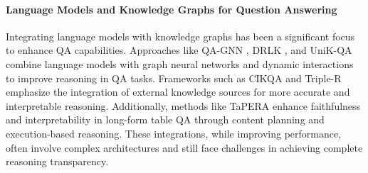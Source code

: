 \paragraph{Language Models and Knowledge Graphs for Question Answering}

Integrating language models with knowledge graphs has been a significant focus to enhance QA capabilities. Approaches like QA-GNN \citep{yasunaga-etal-2021-qa}, DRLK \citep{zhang-etal-2022-drlk}, and UniK-QA \citep{oguz-etal-2022-unik} combine language models with graph neural networks and dynamic interactions to improve reasoning in QA tasks. Frameworks such as CIKQA \citep{zhang-etal-2023-cikqa} and Triple-R \citep{kanaani-etal-2024-triple} emphasize the integration of external knowledge sources for more accurate and interpretable reasoning. Additionally, methods like TaPERA \citep{zhao-etal-2024-tapera} enhance faithfulness and interpretability in long-form table QA through content planning and execution-based reasoning. These integrations, while improving performance, often involve complex architectures and still face challenges in achieving complete reasoning transparency.